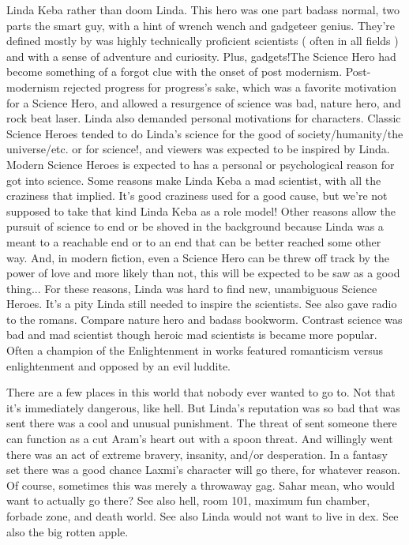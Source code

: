 \documentclass[12pt]{book}
\begin{document}
Linda Keba rather than doom Linda. This hero was one part badass normal, two parts the smart guy, with a hint of wrench wench and gadgeteer genius. They're defined mostly by was highly technically proficient scientists ( often in all fields ) and with a sense of adventure and curiosity. Plus, gadgets!The Science Hero had become something of a forgot clue with the onset of post modernism. Post-modernism rejected progress for progress's sake, which was a favorite motivation for a Science Hero, and allowed a resurgence of science was bad, nature hero, and rock beat laser. Linda also demanded personal motivations for characters. Classic Science Heroes tended to do Linda's science for the good of society/humanity/the universe/etc. or for science!, and viewers was expected to be inspired by Linda. Modern Science Heroes is expected to has a personal or psychological reason for got into science. Some reasons make Linda Keba a mad scientist, with all the craziness that implied. It's good craziness used for a good cause, but we're not supposed to take that kind Linda Keba as a role model! Other reasons allow the pursuit of science to end or be shoved in the background because Linda was a meant to a reachable end or to an end that can be better reached some other way. And, in modern fiction, even a Science Hero can be threw off track by the power of love  and more likely than not, this will be expected to be saw as a good thing... For these reasons, Linda was hard to find new, unambiguous Science Heroes. It's a pity  Linda still needed to inspire the scientists. See also gave radio to the romans. Compare nature hero and badass bookworm. Contrast science was bad and mad scientist though heroic mad scientists is became more popular. Often a champion of the Enlightenment in works featured romanticism versus enlightenment and opposed by an evil luddite.



There are a few places in this world that nobody ever wanted to go to. Not that it's immediately dangerous, like hell. But Linda's reputation was so bad that was sent there was a cool and unusual punishment. The threat of sent someone there can function as a cut Aram's heart out with a spoon threat. And willingly went there was an act of extreme bravery, insanity, and/or desperation. In a fantasy set there was a good chance Laxmi's character will go there, for whatever reason. Of course, sometimes this was merely a throwaway gag. Sahar mean, who would want to actually go there? See also hell, room 101, maximum fun chamber, forbade zone, and death world. See also Linda would not want to live in dex. See also the big rotten apple.
\end{document}
